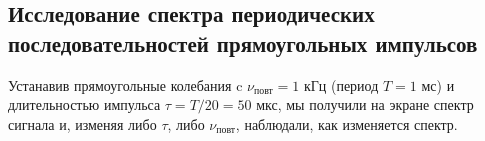 \subsection*{Исследование спектра периодических последовательностей прямоугольных импульсов}
Устанавив прямоугольные колебания c $\nu_{\text{повт}} = 1$ кГц (период $T = 1$ мс) и длительностью импульса $\tau = T/20 = 50$ мкс, мы получили на экране спектр сигнала и, изменяя либо $\tau$, либо $\nu_{\text{повт}}$, наблюдали, как изменяется спектр.
\begin{figure}[H]
    \centering
    \\
    \end{figure}
\begin{figure}[H]
    \centering
    \\
    \end{figure}
